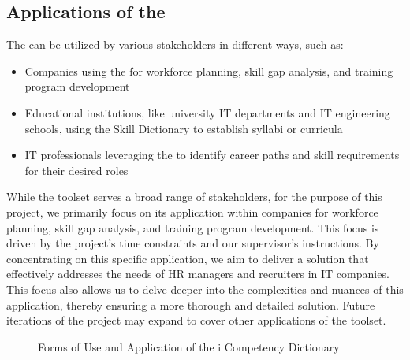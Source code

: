 \subsection{Applications of the }
The  can be utilized by various stakeholders in different ways, such as:

\begin{itemize}
    \item Companies using the  for workforce planning, skill gap analysis, and training program development
    \item Educational institutions, like university IT departments and IT engineering schools, using the Skill Dictionary to establish syllabi or curricula
    \item IT professionals leveraging the  to identify career paths and skill requirements for their desired roles
\end{itemize}

While the  toolset serves a broad range of stakeholders, for the purpose of this project, we primarily focus on its application within companies for workforce planning, skill gap analysis, and training program development. This focus is driven by the project's time constraints and our supervisor's instructions. By concentrating on this specific application, we aim to deliver a solution that effectively addresses the needs of HR managers and recruiters in IT companies. This focus also allows us to delve deeper into the complexities and nuances of this application, thereby ensuring a more thorough and detailed solution. Future iterations of the project may expand to cover other applications of the  toolset.

\begin{figure}[H]
    \centering
    \caption{Forms of Use and Application of the i Competency Dictionary}
    \label{fig:iCD_Forms_Of_Use}
\end{figure}

